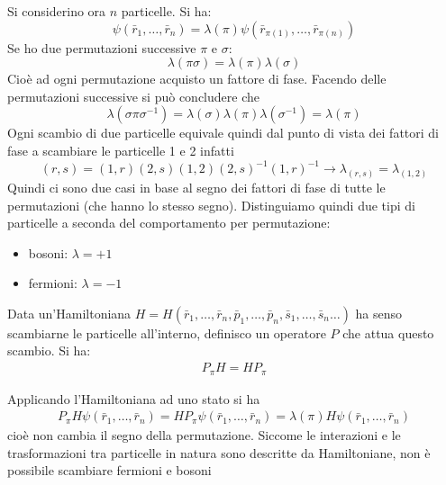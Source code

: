 Si considerino ora $n$ particelle. Si ha:
 \begin{equation*}
 \psi \left(\bar r_1,\dots,\bar r_n\right)=\lambda\left(\pi\right)\psi \left(\bar r_{\pi\left(1\right)},\dots,\bar r_{\pi\left(n\right)}\right)
 \end{equation*}
 Se ho due permutazioni successive $\pi$ e $\sigma$:
\begin{equation*}
\lambda\left(\pi\sigma\right)=\lambda\left(\pi\right)\lambda\left(\sigma\right) 
\end{equation*}
Cioè ad ogni permutazione acquisto un fattore di fase. Facendo delle permutazioni successive si può concludere che 
\begin{equation*}
\lambda\left(\sigma\pi\sigma^{-1}\right)=\lambda\left(\sigma\right)\lambda\left(\pi\right)\lambda\left(\sigma^{-1}\right)=\lambda\left(\pi\right)
\end{equation*} 
Ogni scambio di due particelle equivale quindi dal punto di vista dei fattori di fase a scambiare le particelle 1 e 2 infatti
\begin{equation*}
\left(r,s\right)=\left(1,r\right)\left(2,s\right)\left(1,2\right)\left(2,s\right)^{-1}\left(1,r\right)^{-1} \rightarrow \lambda_{(r,s)}=\lambda_{(1,2)}
\end{equation*}
Quindi ci sono due casi in base al segno dei fattori di fase di tutte le permutazioni (che hanno lo stesso segno). Distinguiamo quindi due tipi di particelle a seconda del comportamento per permutazione: 

\begin{itemize}
\item bosoni: $\lambda=+1$
\item fermioni: $\lambda=-1$
\end{itemize}

Data un'Hamiltoniana $H=H\left(\bar r_1,\dots,\bar r_n,\bar p_1,\dots,\bar p_n,\bar s_1,\dots,\bar s_n \dots\right)$ ha senso scambiarne le particelle all'interno, definisco un operatore $P$ che attua questo scambio. Si ha:
\begin{equation}\begin{split}
P_\pi H=HP_\pi
\end{split}\end{equation}

Applicando l'Hamiltoniana ad uno stato si ha
\begin{equation}\begin{split}
P_\pi H\psi \left(\bar r_1,\dots,\bar r_n\right)=HP_\pi \psi \left(\bar r_1,\dots,\bar r_n\right)=\lambda\left(\pi\right)H\psi \left(\bar r_1,\dots,\bar r_n\right)
\end{split}\end{equation}
cioè non cambia il segno della permutazione. Siccome le interazioni e le trasformazioni tra particelle in natura sono descritte da Hamiltoniane, non è possibile scambiare fermioni e bosoni

